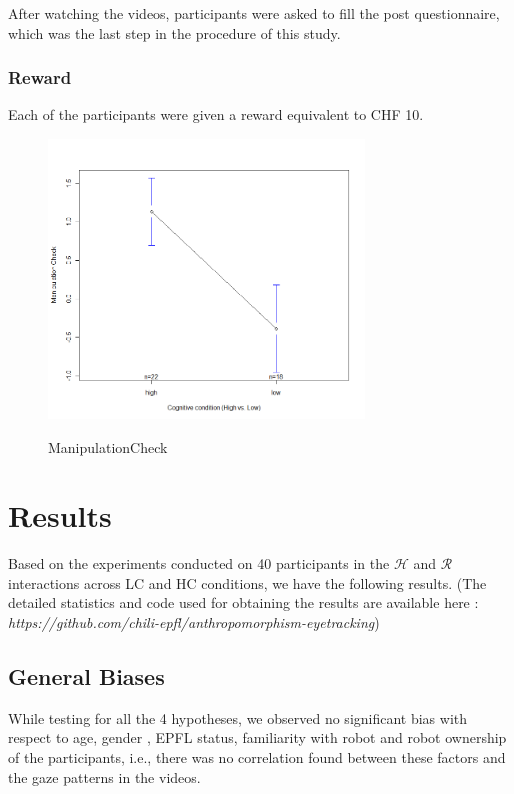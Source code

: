 \documentclass{acm_proc_article-sp}
\begin{document}
After watching the videos, participants were asked to fill the post
questionnaire, which was the last step in the procedure of this study.

\subsubsection{Reward}

Each of the participants were given a reward equivalent to CHF 10.

\begin{figure}
    {\includegraphics[width=3.3in]{ManipulationCheck}}
    \caption{ManipulationCheck}
    \label{fig:ManipulationCheck}
\end{figure}

\section{Results}

Based on the experiments conducted on 40 participants in the $\mathcal{H}$ and
$\mathcal{R}$ interactions across LC and HC conditions, we have the following
results. (The detailed statistics and code used for obtaining the results are
available here : \\
\textit{https://github.com/chili-epfl/anthropomorphism-eyetracking})

\subsection{General Biases}

While testing for all the 4 hypotheses, we observed no significant bias with
respect to age, gender , EPFL status, familiarity with robot and robot ownership
of the participants, i.e., there was no correlation found between these factors
and the gaze patterns in the videos.
\end{document}
